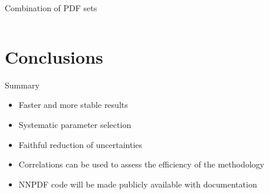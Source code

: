 \documentclass[aspectratio=169,10pt]{beamer}
\begin{document}
\begin{frame}{Combination of PDF sets}
\begin{columns}[t]
\begin{center}
       	\end{center}
			
    	\end{columns}
\end{frame}


\section{Conclusions}


\begin{frame}{Summary}
    \begin{itemize}
        \item Faster and more stable results
        \item Systematic parameter selection 
        \item Faithful reduction of uncertainties
        \item Correlations can be used to assess the efficiency of the methodology
        \vspace*{1em}
        \item NNPDF code will be made publicly available with documentation
    \end{itemize}
\end{frame}




\end{document}
